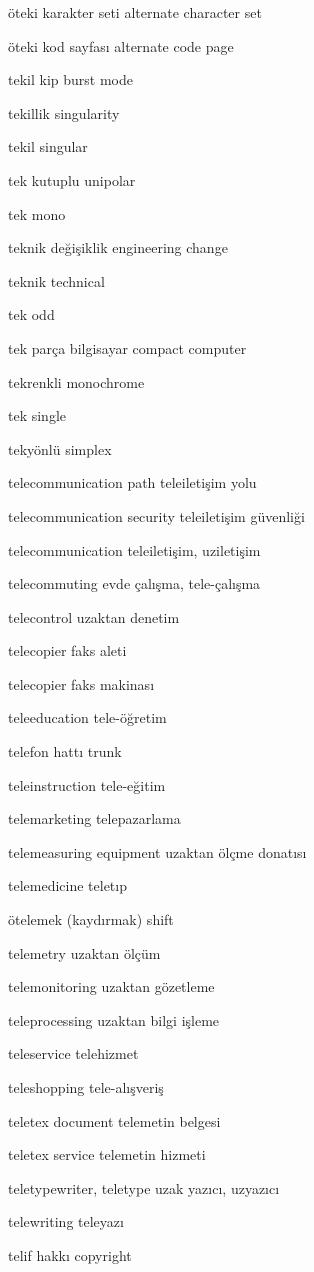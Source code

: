 \documentclass[12pt,fleqn]{article}\usepackage{../../common}
\begin{document}
öteki karakter seti alternate character set

öteki kod sayfası alternate code page

tekil kip burst mode

tekillik singularity

tekil singular

tek kutuplu unipolar

tek mono

teknik değişiklik engineering change

teknik technical

tek odd

tek parça bilgisayar compact computer

tekrenkli monochrome

tek single

tekyönlü simplex

telecommunication path teleiletişim yolu

telecommunication security teleiletişim güvenliği

telecommunication teleiletişim, uziletişim

telecommuting evde çalışma, tele-çalışma

telecontrol uzaktan denetim

telecopier faks aleti

telecopier faks makinası

teleeducation tele-öğretim

telefon hattı trunk

teleinstruction tele-eğitim

telemarketing telepazarlama

telemeasuring equipment uzaktan ölçme donatısı

telemedicine teletıp

ötelemek (kaydırmak) shift

telemetry uzaktan ölçüm

telemonitoring uzaktan gözetleme

teleprocessing uzaktan bilgi işleme

teleservice telehizmet

teleshopping tele-alışveriş

teletex document telemetin belgesi

teletex service telemetin hizmeti

teletypewriter, teletype uzak yazıcı, uzyazıcı

telewriting teleyazı

telif hakkı copyright
\end{document}
